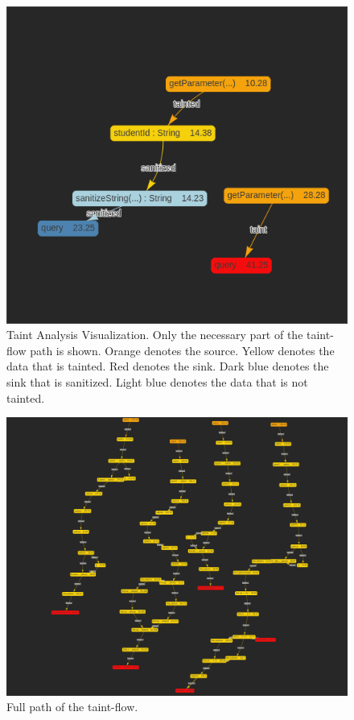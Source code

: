 \documentclass[sigplan,10pt,review]{acmart}
\begin{document}
\begin{figure}[h]
  \centering
  \includegraphics[width=\linewidth]{taint_part}
  \caption{Taint Analysis Visualization. Only the necessary part of the taint-flow path is shown. Orange denotes the source. Yellow denotes the data that is tainted. Red denotes the sink. Dark blue denotes the sink that is sanitized. Light blue denotes the data that is not tainted.}
\end{figure}

\begin{figure}[h]
  \centering
  \includegraphics[width=\linewidth]{taint_full}
  \caption{Full path of the taint-flow. }
\end{figure}
\end{document}
